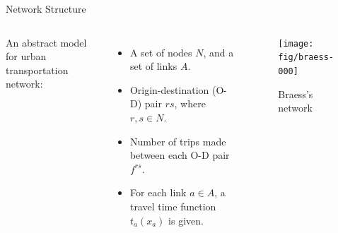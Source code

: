 \documentclass[handout]{beamer}
\begin{document}
\begin{frame}{Network Structure}

\begin{columns}
An abstract model for urban transportation network:
\begin{itemize}
	\item A set of nodes $N$, and a set of links $A$. 
	\item Origin-destination (O-D) pair $rs$, where $r,s \in N$. 
	\item Number of trips made between each O-D pair $f^{rs}$. 
	\item For each link $a \in A$, a travel time function $t_a(x_a)$ is given.
\end{itemize}
\begin{example}
\begin{figure}
\centering
\texttt{[image: fig/braess-000]}
\caption{Braess's network}
\end{figure}
\end{example}
\end{columns}

\end{frame}
\end{document}
